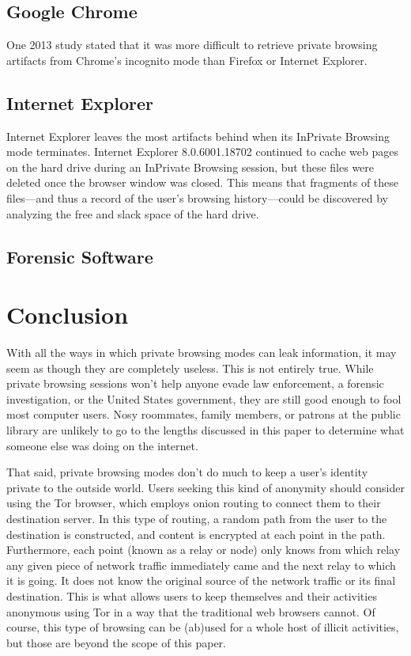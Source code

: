 \documentclass[pdftex,letterpaper,titlepage,12pt]{article}
\begin{document}
    \subsection{Google Chrome}
    One 2013 study stated that it was more difficult to retrieve private
	browsing artifacts from Chrome's incognito mode than Firefox or Internet
	Explorer.\cite{said11} 

    \subsection{Internet Explorer}
    Internet Explorer leaves the most artifacts behind when its InPrivate
    Browsing mode terminates.\cite{ohana13} Internet Explorer 8.0.6001.18702
	continued to cache web pages on the hard drive during an InPrivate
	Browsing session, but these files were deleted once the browser window was
	closed. This means that fragments of these files---and thus a record of the
	user's browsing history---could be discovered by analyzing the free and
	slack space of the hard drive.\cite{said11}

    \subsection{Forensic Software}


  \section{Conclusion}
  With all the ways in which private browsing modes can leak information, it
  may seem as though they are completely useless. This is not entirely true.
  While private browsing sessions won't help anyone evade law enforcement, a
  forensic investigation, or the United States government, they are still good
  enough to fool most computer users. Nosy roommates, family members, or
  patrons at the public library are unlikely to go to the lengths discussed in
  this paper to determine what someone else was doing on the internet.

  That said, private browsing modes don't do much to keep a user's identity
  private to the outside world. Users seeking this kind of anonymity should 
  consider using the Tor browser, which employs onion routing to connect them 
  to their destination server. In this type of routing, a random path from the 
  user to the destination is constructed, and content is encrypted at each 
  point in the path. Furthermore, each point (known as a relay or node) only 
  knows from which relay any given piece of network traffic immediately came 
  and the next relay to which it is going. It does not know the original source
  of the network traffic or its final destination. This is what allows users to
  keep themselves and their activities anonymous using Tor in a way that the 
  traditional web browsers cannot.\cite{tor13} Of course, this type of browsing
  can be (ab)used for a whole host of illicit activities, but those are beyond
  the scope of this paper.
\end{document}
